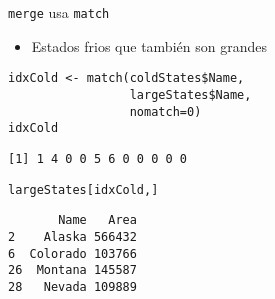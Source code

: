 \documentclass[xcolor={usenames,svgnames,dvipsnames}]{beamer}
\begin{document}
\begin{frame}[label={sec:org997596f},fragile]{\texttt{merge} usa \texttt{match}}
 \begin{itemize}
\item Estados frios que también son grandes
\end{itemize}
\lstset{language=r,label= ,caption= ,captionpos=b,numbers=none}
\begin{lstlisting}
idxCold <- match(coldStates$Name,
                 largeStates$Name,
                 nomatch=0)
idxCold
\end{lstlisting}

\begin{verbatim}
[1] 1 4 0 0 5 6 0 0 0 0 0
\end{verbatim}


\lstset{language=r,label= ,caption= ,captionpos=b,numbers=none}
\begin{lstlisting}
largeStates[idxCold,]
\end{lstlisting}

\begin{verbatim}
       Name   Area
2    Alaska 566432
6  Colorado 103766
26  Montana 145587
28   Nevada 109889
\end{verbatim}
\end{frame}
\end{document}
